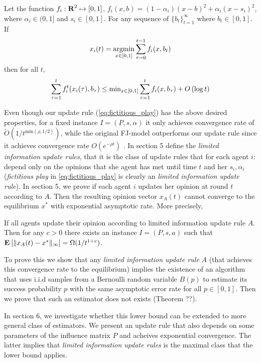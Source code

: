 \begin{theorem}\label{t:fictitious_noregret}
Let the function $f_i:\bm{\mathrm{R}}^2 \mapsto [0,1]$, $f_i(x,b) = (1-\alpha_i)(x-b)^2 + \alpha_i(x-s_i)^2$, where $\alpha_i \in (0,1]$ and $s_i \in [0,1]$.
For any sequence of $\{b_t\}_{t=1}^\infty$ where $b_t \in [0,1]$. If 
\[x_i(t) = \operatorname*{argmin}_{x \in [0,1]}\sum_{\tau=0}^{t-1}f_i(x,b_t)\] then for all $t$,
\[\sum_{\tau=1}^tf_i^t(x_i(\tau),b_\tau) \leq \text{min}_{x \in [0,1]}\sum_{\tau=1}^tf_i(x,b_\tau) + O\left(\log t\right)\]
\end{theorem}

Even though our update rule (\ref{eq:fictitious_play}) has the above
desired properties, for a fixed instance $I=(P,s,\alpha)$ it only achieves convergence rate of
$\widetilde{O}(1/t^{\text{min}(\rho,1/2)})$, while the original FJ-model outperforms
our update rule since it achieves convergence rate $O(e^{-\rho t})$ \cite{GS14}.
In section 5 define the \emph{limited information update rules}, that it is the class
of update rules that for each agent $i$: depend only on the opinions that she agent has met
until time $t$ and her $s_i,\alpha_i$ (\emph{fictitious play} in \ref{eq:fictitious_play} 
is clearly an \emph{limited information update rule}).
In section 5, we prove if each agent $i$ updates her 
opinion at round $t$ according to $A$. Then the resulting opinion vector $x_A(t)$ cannot converge to the equilibrium $x^*$ 
with exponential asymptotic rate. More precisely,
\begin{theorem}\label{thm:lower_bound}
If all agents update their opinion according to limited information update rule $A$. Then for any $c>0$ there
exists an instance $I=(P,s,a)$ such that $\Exp{\norm{\infty}{x_A(t) - x^*}} = \Omega(1/t^{1+c})$.
\end{theorem}

To prove this we show that any \emph{limited information update rule} $A$
(that achieves this convergence rate to the equilibrium) implies
the existence of an algorithm that uses i.i.d samples from a Bernoulli random
variable $B(p)$ to estimate its success probability $p$ with the same asymptotic
error rate for all $p \in [0,1]$. Then we prove that such an estimator does not exists (Theorem ??).

In section 6, we investigate whether this lower bound can be extended to more
general class of estimators. We present an update rule that also depends on some parameters of the influence matrix $P$ 
and acheives exponential convergence. The latter implies that \emph{limited information update rules}
is the maximal class that the lower bound applies.

